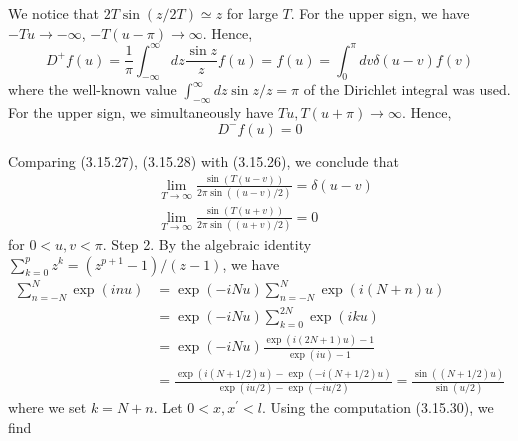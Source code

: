 \documentclass{article}
\begin{document}
We notice that $2 T \sin (z / 2 T) \simeq z$ for large $T$. For the upper sign, we have $-T u \rightarrow-\infty$, $-T(u-\pi) \rightarrow \infty$. Hence,
$$
\begin{equation*}
D^{+} f(u)=\frac{1}{\pi} \int_{-\infty}^{\infty} d z \frac{\sin z}{z} f(u)=f(u)=\int_{0}^{\pi} d v \delta(u-v) f(v) \tag{3.15.27}
\end{equation*}
$$
where the well-known value $\int_{-\infty}^{\infty} d z \sin z / z=\pi$ of the Dirichlet integral was used. For the upper sign, we simultaneously have $T u, T(u+\pi) \rightarrow \infty$. Hence,
$$
\begin{equation*}
D^{-} f(u)=0 \tag{3.15.28}
\end{equation*}
$$

Comparing (3.15.27), (3.15.28) with (3.15.26), we conclude that
$$
\begin{align*}
& \lim _{T \rightarrow \infty} \frac{\sin (T(u-v))}{2 \pi \sin ((u-v) / 2)}=\delta(u-v)  \tag{3.15.29}\\
& \lim _{T \rightarrow \infty} \frac{\sin (T(u+v))}{2 \pi \sin ((u+v) / 2)}=0 \tag{3.15.30}
\end{align*}
$$
for $0<u, v<\pi$.
Step 2. By the algebraic identity $\sum_{k=0}^{p} z^{k}=\left(z^{p+1}-1\right) /(z-1)$, we have
$$
\begin{align*}
\sum_{n=-N}^{N} \exp (i n u) & =\exp (-i N u) \sum_{n=-N}^{N} \exp (i(N+n) u)  \tag{3.15.31}\\
& =\exp (-i N u) \sum_{k=0}^{2 N} \exp (i k u) \\
& =\exp (-i N u) \frac{\exp (i(2 N+1) u)-1}{\exp (i u)-1} \\
& =\frac{\exp (i(N+1 / 2) u)-\exp (-i(N+1 / 2) u)}{\exp (i u / 2)-\exp (-i u / 2)}=\frac{\sin ((N+1 / 2) u)}{\sin (u / 2)}
\end{align*}
$$
where we set $k=N+n$. Let $0<x, x^{\prime}<l$. Using the computation (3.15.30), we find
\end{document}
